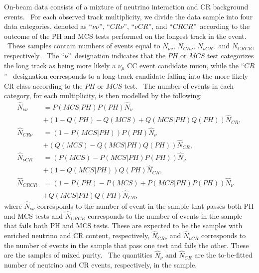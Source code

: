 \documentclass{article}
\begin{document}
On-beam data consists of a mixture of neutrino interaction and CR background
events. \ For each observed track multiplicity, we divide the data sample into
four data categories, denoted as \textquotedblleft$\nu\nu$\textquotedblright, \textquotedblleft$CR\nu
$\textquotedblright, \textquotedblleft$\nu CR$\textquotedblright, and \textquotedblleft$CRCR$\textquotedblright\ according
to the outcome of the PH and MCS tests performed on the longest track in the
event. \ These samples contain numbers of events equal to $N_{\nu\nu}$,
$N_{CR\nu}$, $N_{\nu CR},$ and $N_{CRCR}$, respectively. \ The
\textquotedblleft$\nu$\textquotedblright\ designation indicates that the $PH$
or $MCS$ test categorizes the long track as being more likely a $\nu_{\mu}$ CC
event candidate muon, while the \textquotedblleft$CR$\textquotedblright%
\ designation corresponds to a long track candidate falling into the more
likely CR class according to the $PH$ or $MCS$ test. \ The number of events in
each category, for each multiplicity, is then modelled by the following:
\begin{align}
\hat{N}_{\nu\nu} &  =P\left(  MCS|PH\right)  P\left(  PH\right)  \hat{N}_{\nu
}\label{model 1}\\
&  +\left(  1-Q\left(  PH\right)  -Q\left(  MCS\right)  +Q\left(
MCS|PH\right)  Q\left(  PH\right)  \right)  \hat{N}_{CR},\nonumber\\
\hat{N}_{CR\nu} &  =\left(  1-P\left(  MCS|PH\right)  \right)  P\left(
PH\right)  \hat{N}_{\nu}\label{model 2}\\
&  +\left(  Q\left(  MCS\right)  -Q\left(  MCS|PH\right)  Q\left(  PH\right)
\right)  \hat{N}_{CR},\nonumber\\
\hat{N}_{\nu CR} &  =\left(  P\left(  MCS\right)  -P\left(  MCS|PH\right)
P\left(  PH\right)  \right)  \hat{N}_{\nu}\label{model 3}\\
&  +\left(  1-Q\left(  MCS|PH\right)  \right)  Q\left(  PH\right)  \hat
{N}_{CR},\nonumber\\
\hat{N}_{CRCR} &  =\left(  1-P\left(  PH\right)  -P\left(  MCS\right)
+P\left(  MCS|PH\right)  P\left(  PH\right)  \right)  \hat{N}_{\nu
}\label{model 4}\\
&  +Q\left(  MCS|PH\right)  Q\left(  PH\right)  \hat{N}_{CR},\nonumber
\end{align}
where $\hat{N}_{\nu\nu}$ corresponds to the number of event in the sample that
passes both PH and MCS tests and $\hat{N}_{CRCR}$ corresponds to the number of
events in the sample that fails both PH and MCS tests. These are expected to
be the samples with enriched neutrino and CR content, respectively, $\hat{N}_{CR\nu}$ and $\hat{N}_{\nu CR}$ corresponds to the number of events
in the sample that pass one test and fails the other. These are the samples
of mixed purity. \ The quantities $\hat{N}_{\nu}$ and $\hat{N}_{CR}$ are the
to-be-fitted number of neutrino and CR events, respectively, in the sample. \ 
\end{document}
